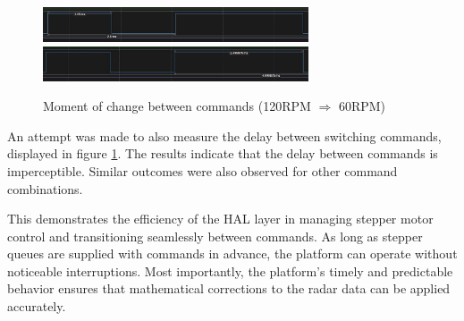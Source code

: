 \begin{figure}[h!]
	\centering
	\includegraphics[width=0.7\textwidth]{../img/120rpm_to60_1.jpg}
	\includegraphics[width=0.7\textwidth]{../img/120rpm_to60_2.jpg}
	\caption[Moment of change between commands with 120RPM and 60RPM]{Moment of change between commands (120RPM $\Rightarrow$  60RPM)}
	\label{fig:switching}
\end{figure}

An attempt was made to also measure the delay  between switching commands, displayed in figure \ref{fig:switching}.
The results indicate that the delay between commands is imperceptible.
Similar outcomes were also observed for other command combinations.

This demonstrates the efficiency of the HAL layer in managing stepper motor control and transitioning seamlessly between commands.
As long as stepper queues are supplied with commands in advance, the platform can operate without noticeable interruptions.
Most importantly, the platform’s timely and predictable behavior ensures that mathematical corrections to the radar data can be applied accurately.






\listoffigures

\listoftables

\clearpage
\openright

